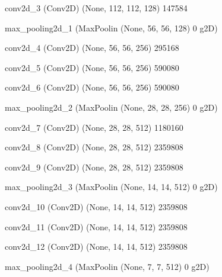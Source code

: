 \documentclass[11pt, a4paper]{article} %
\begin{document}
 conv2d_3 (Conv2D)           (None, 112, 112, 128)     147584    
                                                                 
 max_pooling2d_1 (MaxPoolin  (None, 56, 56, 128)       0         
 g2D)                                                            
                                                                 
 conv2d_4 (Conv2D)           (None, 56, 56, 256)       295168    
                                                                 
 conv2d_5 (Conv2D)           (None, 56, 56, 256)       590080    
                                                                 
 conv2d_6 (Conv2D)           (None, 56, 56, 256)       590080    
                                                                 
 max_pooling2d_2 (MaxPoolin  (None, 28, 28, 256)       0         
 g2D)                                                            
                                                                 
 conv2d_7 (Conv2D)           (None, 28, 28, 512)       1180160   
                                                                 
 conv2d_8 (Conv2D)           (None, 28, 28, 512)       2359808   
                                                                 
 conv2d_9 (Conv2D)           (None, 28, 28, 512)       2359808   
                                                                 
 max_pooling2d_3 (MaxPoolin  (None, 14, 14, 512)       0         
 g2D)                                                            
                                                                 
 conv2d_10 (Conv2D)          (None, 14, 14, 512)       2359808   
                                                                 
 conv2d_11 (Conv2D)          (None, 14, 14, 512)       2359808   
                                                                 
 conv2d_12 (Conv2D)          (None, 14, 14, 512)       2359808   
                                                                 
 max_pooling2d_4 (MaxPoolin  (None, 7, 7, 512)         0         
 g2D)                                                            
                                                                 
\end{document}

